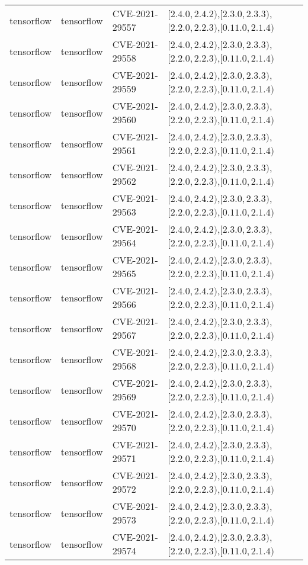 \begin{tabular}{llll}
tensorflow & tensorflow & CVE-2021-29557 & $[2.4.0,2.4.2)$,$[2.3.0,2.3.3)$,$[2.2.0,2.2.3)$,$[0.11.0,2.1.4)$ \\
tensorflow & tensorflow & CVE-2021-29558 & $[2.4.0,2.4.2)$,$[2.3.0,2.3.3)$,$[2.2.0,2.2.3)$,$[0.11.0,2.1.4)$ \\
tensorflow & tensorflow & CVE-2021-29559 & $[2.4.0,2.4.2)$,$[2.3.0,2.3.3)$,$[2.2.0,2.2.3)$,$[0.11.0,2.1.4)$ \\
tensorflow & tensorflow & CVE-2021-29560 & $[2.4.0,2.4.2)$,$[2.3.0,2.3.3)$,$[2.2.0,2.2.3)$,$[0.11.0,2.1.4)$ \\
tensorflow & tensorflow & CVE-2021-29561 & $[2.4.0,2.4.2)$,$[2.3.0,2.3.3)$,$[2.2.0,2.2.3)$,$[0.11.0,2.1.4)$ \\
tensorflow & tensorflow & CVE-2021-29562 & $[2.4.0,2.4.2)$,$[2.3.0,2.3.3)$,$[2.2.0,2.2.3)$,$[0.11.0,2.1.4)$ \\
tensorflow & tensorflow & CVE-2021-29563 & $[2.4.0,2.4.2)$,$[2.3.0,2.3.3)$,$[2.2.0,2.2.3)$,$[0.11.0,2.1.4)$ \\
tensorflow & tensorflow & CVE-2021-29564 & $[2.4.0,2.4.2)$,$[2.3.0,2.3.3)$,$[2.2.0,2.2.3)$,$[0.11.0,2.1.4)$ \\
tensorflow & tensorflow & CVE-2021-29565 & $[2.4.0,2.4.2)$,$[2.3.0,2.3.3)$,$[2.2.0,2.2.3)$,$[0.11.0,2.1.4)$ \\
tensorflow & tensorflow & CVE-2021-29566 & $[2.4.0,2.4.2)$,$[2.3.0,2.3.3)$,$[2.2.0,2.2.3)$,$[0.11.0,2.1.4)$ \\
tensorflow & tensorflow & CVE-2021-29567 & $[2.4.0,2.4.2)$,$[2.3.0,2.3.3)$,$[2.2.0,2.2.3)$,$[0.11.0,2.1.4)$ \\
tensorflow & tensorflow & CVE-2021-29568 & $[2.4.0,2.4.2)$,$[2.3.0,2.3.3)$,$[2.2.0,2.2.3)$,$[0.11.0,2.1.4)$ \\
tensorflow & tensorflow & CVE-2021-29569 & $[2.4.0,2.4.2)$,$[2.3.0,2.3.3)$,$[2.2.0,2.2.3)$,$[0.11.0,2.1.4)$ \\
tensorflow & tensorflow & CVE-2021-29570 & $[2.4.0,2.4.2)$,$[2.3.0,2.3.3)$,$[2.2.0,2.2.3)$,$[0.11.0,2.1.4)$ \\
tensorflow & tensorflow & CVE-2021-29571 & $[2.4.0,2.4.2)$,$[2.3.0,2.3.3)$,$[2.2.0,2.2.3)$,$[0.11.0,2.1.4)$ \\
tensorflow & tensorflow & CVE-2021-29572 & $[2.4.0,2.4.2)$,$[2.3.0,2.3.3)$,$[2.2.0,2.2.3)$,$[0.11.0,2.1.4)$ \\
tensorflow & tensorflow & CVE-2021-29573 & $[2.4.0,2.4.2)$,$[2.3.0,2.3.3)$,$[2.2.0,2.2.3)$,$[0.11.0,2.1.4)$ \\
tensorflow & tensorflow & CVE-2021-29574 & $[2.4.0,2.4.2)$,$[2.3.0,2.3.3)$,$[2.2.0,2.2.3)$,$[0.11.0,2.1.4)$ \\

\end{tabular}

